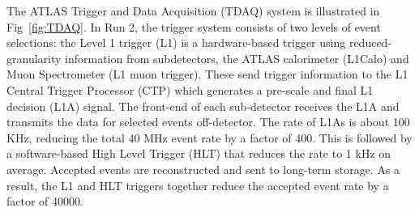 The ATLAS Trigger and Data Acquisition (TDAQ) system \cite{Ruiz-Martinez:2133909} is illustrated in Fig~\ref{fig:TDAQ}. In Run 2, the trigger system consists of two levels of event selections: the Level 1 trigger (L1) is 
a hardware-based trigger using reduced-granularity information from subdetectors, the ATLAS calorimeter (L1Calo) and Muon Spectrometer (L1 muon trigger).
These send trigger information to the L1 Central Trigger Processor (CTP) which generates a pre-scale and final L1 decision (L1A) signal. 
The front-end of each sub-detector receives the L1A and transmits the data for selected events off-detector. 
The rate of L1As is about 100 KHz, reducing the total 40 MHz event rate by a factor of 400. This is followed by a software-based High Level Trigger (HLT) that reduces the rate to 1 kHz on average. Accepted events are reconstructed and sent to long-term storage. As a result, the L1 and HLT triggers together reduce the accepted event rate by a factor of 40000.

